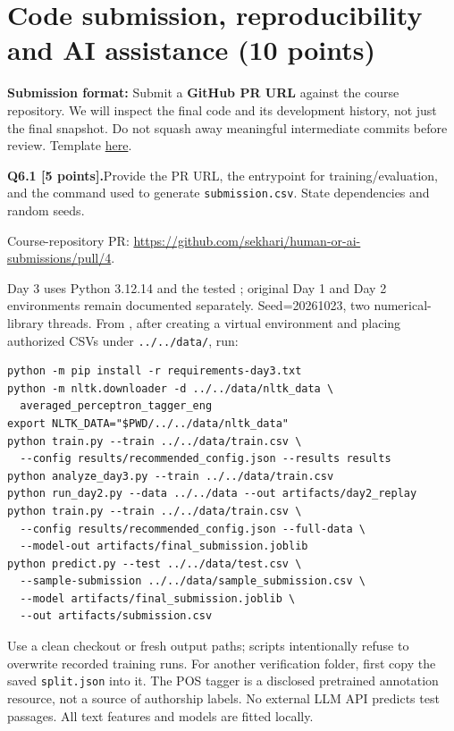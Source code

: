 \documentclass[11pt,letterpaper]{article}
\newcommand{\question}[2]{\needspace{4\baselineskip}\par\addvspace{0.45em}\noindent\textbf{#1}\quad #2\par\nobreak\vspace{0.1em}}
\begin{document}
\section{Code submission, reproducibility and AI assistance (10 points)}
\textbf{Submission format:} Submit a \textbf{GitHub PR URL} against the course repository. We will inspect the final code and its development history, not just the final snapshot. Do not squash away meaningful intermediate commits before review. Template \href{https://github.com/sekhari/human-or-ai-submissions}{here}.

\question{Q6.1 [5 points].}{Provide the PR URL, the entrypoint for training/evaluation, and the command used to generate \texttt{submission.csv}. State dependencies and random seeds.}

Course-repository PR: \url{https://github.com/sekhari/human-or-ai-submissions/pull/4}. \par Day 3 uses Python 3.12.14 and the tested ; original Day 1 and Day 2 environments remain documented separately. Seed=20261023, two numerical-library threads. From , after creating a virtual environment and placing authorized CSVs under \texttt{../../data/}, run:
\begin{small}\begin{verbatim}
python -m pip install -r requirements-day3.txt
python -m nltk.downloader -d ../../data/nltk_data \
  averaged_perceptron_tagger_eng
export NLTK_DATA="$PWD/../../data/nltk_data"
python train.py --train ../../data/train.csv \
  --config results/recommended_config.json --results results
python analyze_day3.py --train ../../data/train.csv
python run_day2.py --data ../../data --out artifacts/day2_replay
python train.py --train ../../data/train.csv \
  --config results/recommended_config.json --full-data \
  --model-out artifacts/final_submission.joblib
python predict.py --test ../../data/test.csv \
  --sample-submission ../../data/sample_submission.csv \
  --model artifacts/final_submission.joblib \
  --out artifacts/submission.csv
\end{verbatim}\end{small}
Use a clean checkout or fresh output paths; scripts intentionally refuse to overwrite recorded training runs. For another verification folder, first copy the saved \texttt{split.json} into it. The POS tagger is a disclosed pretrained annotation resource, not a source of authorship labels. No external LLM API predicts test passages. All text features and models are fitted locally.
\end{document}
